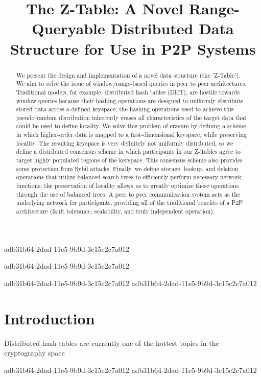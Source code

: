 \documentclass[12pt]{article}
\title{The Z-Table: A Novel Range-Queryable Distributed Data Structure for Use in P2P Systems}
\begin{document}
\maketitle

adb31b64-2dad-11e5-9b9d-3c15c2c7a012\begin{abstract}
We present the design and implementation of a novel data structure (the 'Z-Table'). We aim to solve the issue of window/range-based queries in peer to peer architectures. Traditional models, for example,  distributed hash tables (DHT), are hostile towards window queries because their hashing operations are designed to uniformly distribute stored data across a defined keyspace; the hashing operations used to achieve this pseudo-random distribution inherently erases all characteristics of the target data that could be used to define locality. We solve this problem of erasure by defining a scheme in which higher-order data is mapped to a first-dimensional keyspace, while preserving locality. The resulting keyspace is very definitely not uniformly distributed, so we define a distributed consensus scheme in which participants in our Z-Tables agree to target highly populated regions of the keyspace. This consensus scheme also provides some protection from Sybil attacks. Finally, we define storage, lookup, and deletion operations that utilize balanced search trees to efficiently perform necessary network functions; the preservation of locality allows us to greatly optimize these operations through the use of balanced trees. A peer to peer communication system acts as the underlying network for participants, providing all of the traditional benefits of a P2P architecture (fault tolerance, scalability, and truly independent operation).
\end{abstract}
adb31b64-2dad-11e5-9b9d-3c15c2c7a012

adb31b64-2dad-11e5-9b9d-3c15c2c7a012\newpage
adb31b64-2dad-11e5-9b9d-3c15c2c7a012\section{Introduction}
Distributed hash tables are currently one of the hottest topics in the cryptography space~\cite{Stoica:2001dj,Rowstron:2001ea,Ratnasamy:2001wn}

adb31b64-2dad-11e5-9b9d-3c15c2c7a012\printbibliography
adb31b64-2dad-11e5-9b9d-3c15c2c7a012
\end{document}

